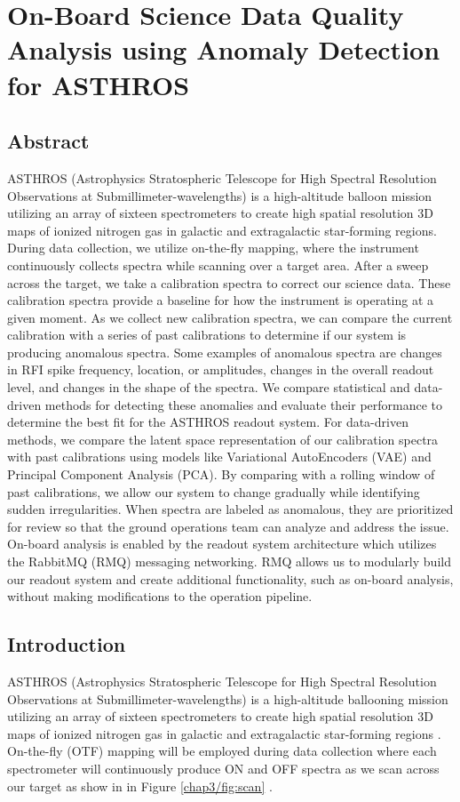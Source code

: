 \chapter[On-Board Science Data Quality Analysis using Anomaly Detection for ASTHROS]{On-Board Science Data Quality Analysis using Anomaly Detection for ASTHROS}
\section{Abstract}
ASTHROS (Astrophysics Stratospheric Telescope for High Spectral Resolution Observations at Submillimeter-wavelengths) is a high-altitude balloon mission utilizing an array of sixteen spectrometers to create high spatial resolution 3D maps of ionized nitrogen gas in galactic and extragalactic star-forming regions.
During data collection, we utilize on-the-fly mapping, where the instrument continuously collects spectra while scanning over a target area.
After a sweep across the target, we take a calibration spectra to correct our science data.
These calibration spectra provide a baseline for how the instrument is operating at a given moment.
As we collect new calibration spectra, we can compare the current calibration with a series of past calibrations to determine if our system is producing anomalous spectra.
Some examples of anomalous spectra are changes in RFI spike frequency, location, or amplitudes, changes in the overall readout level, and changes in the shape of the spectra.
We compare statistical and data-driven methods for detecting these anomalies and evaluate their performance to determine the best fit for the ASTHROS readout system. For data-driven methods, we compare the latent space representation of our calibration spectra with past calibrations using models like Variational AutoEncoders (VAE) and Principal Component Analysis (PCA).
By comparing with a rolling window of past calibrations, we allow our system to change gradually while identifying sudden irregularities.
When spectra are labeled as anomalous, they are prioritized for review so that the ground operations team can analyze and address the issue.
On-board analysis is enabled by the readout system architecture which utilizes the RabbitMQ (RMQ) messaging networking.
RMQ allows us to modularly build our readout system and create additional functionality, such as on-board analysis, without making modifications to the operation pipeline. 


\section{Introduction}
ASTHROS (Astrophysics Stratospheric Telescope for High Spectral Resolution Observations at Submillimeter-wavelengths) is a high-altitude ballooning mission utilizing an array of sixteen spectrometers to create high spatial resolution 3D maps of ionized nitrogen gas in galactic and extragalactic star-forming regions \cite{siles2020asthros}. 
On-the-fly (OTF) mapping will be employed during data collection where each spectrometer will continuously produce ON and OFF spectra as we scan across our target as show in in Figure \ref{chap3/fig:scan} \cite{mangum2007fly}. 

